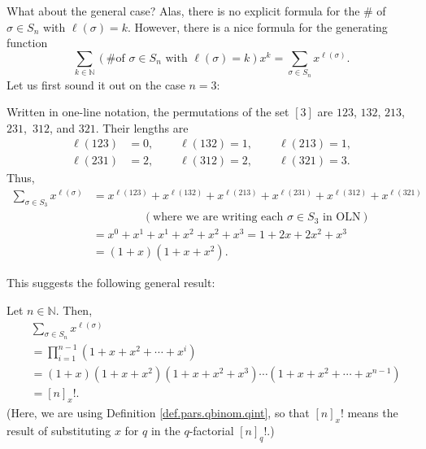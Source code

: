 What about the general case? Alas, there is no explicit formula for the \# of
$\sigma\in S_{n}$ with $\ell\left(  \sigma\right)  =k$. However, there is a
nice formula for the generating function%
\[
\sum_{k\in\mathbb{N}}\left(  \text{\# of }\sigma\in S_{n}\text{ with }%
\ell\left(  \sigma\right)  =k\right)  x^{k}=\sum_{\sigma\in S_{n}}%
x^{\ell\left(  \sigma\right)  }.
\]
Let us first sound it out on the case $n=3$:

\begin{example}
Written in one-line notation, the permutations of the set $\left[  3\right]  $
are $123$, $132$, $213$, $231$,\ $312$, and $321$. Their lengths are%
\begin{align*}
\ell\left(  123\right)   &  =0,\ \ \ \ \ \ \ \ \ \ \ell\left(  132\right)
=1,\ \ \ \ \ \ \ \ \ \ \ell\left(  213\right)  =1,\\
\ell\left(  231\right)   &  =2,\ \ \ \ \ \ \ \ \ \ \ell\left(  312\right)
=2,\ \ \ \ \ \ \ \ \ \ \ell\left(  321\right)  =3.
\end{align*}
Thus,
\begin{align*}
\sum_{\sigma\in S_{3}}x^{\ell\left(  \sigma\right)  }  &  =x^{\ell\left(
123\right)  }+x^{\ell\left(  132\right)  }+x^{\ell\left(  213\right)
}+x^{\ell\left(  231\right)  }+x^{\ell\left(  312\right)  }+x^{\ell\left(
321\right)  }\\
&  \ \ \ \ \ \ \ \ \ \ \ \ \ \ \ \ \ \ \ \ \left(  \text{where we are writing
each }\sigma\in S_{3}\text{ in OLN}\right) \\
&  =x^{0}+x^{1}+x^{1}+x^{2}+x^{2}+x^{3}=1+2x+2x^{2}+x^{3}\\
&  =\left(  1+x\right)  \left(  1+x+x^{2}\right)  .
\end{align*}

\end{example}

This suggests the following general result:

\begin{proposition}
\label{prop.perm.length.gf}Let $n\in\mathbb{N}$. Then,%
\begin{align*}
&  \sum_{\sigma\in S_{n}}x^{\ell\left(  \sigma\right)  }\\
&  =\prod_{i=1}^{n-1}\left(  1+x+x^{2}+\cdots+x^{i}\right) \\
&  =\left(  1+x\right)  \left(  1+x+x^{2}\right)  \left(  1+x+x^{2}%
+x^{3}\right)  \cdots\left(  1+x+x^{2}+\cdots+x^{n-1}\right) \\
&  =\left[  n\right]  _{x}!.
\end{align*}
(Here, we are using Definition \ref{def.pars.qbinom.qint}, so that $\left[
n\right]  _{x}!$ means the result of substituting $x$ for $q$ in the
$q$-factorial $\left[  n\right]  _{q}!$.)
\end{proposition}

